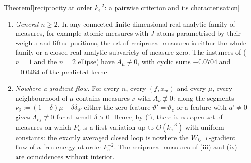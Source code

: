 \begin{thm}{Theorem}{I}[reciprocity at order $k_e^{-2}$: a pairwise criterion and its characterisation]
\begin{enumerate}[label=(\roman*)]
\begin{enumerate}[label=(\alph*)]
    \end{enumerate}
    Vanishing of $r_\mu$ on the orbit constrains only its tangential derivative, so (b) is a genuine extra condition:
    for $f:=\fhat_\mu+he_1$ with $h=0$ on the orbit and $\partial_\perp h\neq0$,
    $A_\mu-2K=-\int\varphi_\xi\varphi_{\xi'}\partial_\perp h\dd\rho\cdot(e_1e_\perp^\T-e_\perp e_1^\T)\neq0$. When
    $r_\mu$ vanishes on a neighbourhood of the orbit, $Dr_\mu=0$ there and $A_\mu=2K$: the semi-gradient defect has
    vanished and the loop is non-reciprocal exactly when the orbit carries circulation, through the orbit-area kernel
    alone.
  \item \emph{General $n\ge2$.} In any connected finite-dimensional real-analytic family of measures, for example
    atomic measures with $J$ atoms parametrised by their weights and lifted positions, the set of reciprocal measures
    is either the whole family or a closed real-analytic subvariety of measure zero. The instances of
     ($n=1$ and the $n=2$ ellipse) have $A_\mu\not\equiv0$, with cyclic sums $-0.0704$
    and $-0.0464$ of the predicted kernel.
  \item \emph{Nowhere a gradient flow.} For every $n$, every $(f,x_m)$ and every $\mu$, every neighbourhood of $\mu$
    contains measures $\nu$ with $A_\nu\not\equiv0$: along the segments $\nu_\delta:=(1-\delta)\mu+\delta\delta_{\vartheta'}$
    either the zero feature $\vartheta'=\vartheta_z$ or a feature with $a'\neq0$ gives $A_{\nu_\delta}\not\equiv0$ for
    all small $\delta>0$. Hence, by (i), there is no open set of measures on which $P_\nu$ is a first variation up to
    $O(k_e^{-3})$ with uniform constants: the exactly averaged closed loop is nowhere the $W_{G^{-1}}$-gradient flow of a
    free energy at order $k_e^{-2}$. The reciprocal measures of (iii) and (iv) are coincidences without interior.
\end{enumerate}
\end{thm}

